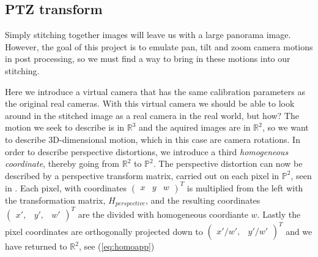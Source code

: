 \subsection{PTZ transform}
	Simply stitching together images will leave us with a large panorama image.
        However, the goal of this project is to emulate pan, tilt and zoom camera motions in post processing, so we must find a way to bring in these motions into our stitching.

	Here we introduce a virtual camera that has the same calibration parameters as the original real cameras.
	With this virtual camera we should be able to look around in the stitched image as a real camera in the real world, but how?
	The motion we seek to describe is in $\mathbb{R}^3$ and the aquired images are in $\mathbb{R}^2$, so we want to describe 3D-dimensional motion, which in this case are camera rotations.
	In order to describe perspective distortions, we introduce a third \emph{homogeneous coordinate}, thereby going from $\mathbb{R}^2$ to $\mathbb{P}^2$.
	The perspective distortion can now be described by a perspective transform matrix, carried out on each pixel in $\mathbb{P}^2$, seen in \cite{hartley2003Multiple}.
	Each pixel, with coordinates $\left( \begin{smallmatrix} x & y & w \end{smallmatrix} \right)^T$ 
	is multiplied from the left with the transformation matrix, $H_{perspective}$, and the resulting coordinates $ \left( \begin{smallmatrix} x', & y', & w' \end{smallmatrix} \right) ^T$ are the divided with homogeneous coordiante $w$. 
	Lastly the pixel coordinates are orthogonally projected down to $\left( \begin{smallmatrix} x'/w', & y'/w' \end{smallmatrix} \right)^T$ and we have returned to $\mathbb{R}^2$, see (\ref{eq:homoapp})

